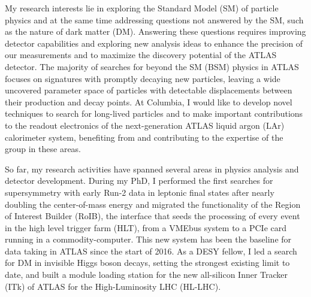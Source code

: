 \documentclass[a4paper]{article}
\begin{document}
\thispagestyle{fancy} 
 \lfoot{} \rfoot{\bf \thepage} \cfoot{}

\fontsize{11}{14}
\selectfont


My research interests lie in exploring the Standard Model (SM) of particle physics and at the same time addressing questions not answered by the SM, such as the nature of dark matter (DM). Answering these questions requires improving detector capabilities and exploring new analysis ideas to enhance the precision of our measurements and to maximize the discovery potential of the ATLAS detector. The majority of searches for beyond the SM (BSM) physics in ATLAS focuses on signatures with promptly decaying new particles, leaving a wide uncovered parameter space of particles with detectable displacements between their production and decay points. At Columbia, I would like to develop novel techniques to search for long-lived particles and to make important contributions to the readout electronics of the next-generation ATLAS liquid argon (LAr) calorimeter system, benefiting from and contributing to the expertise of the group in these areas.

\bigskip

So far, my research activities have spanned several areas in physics analysis and detector development. During my PhD, I performed the first searches for supersymmetry with early Run-2 data in leptonic final states after nearly doubling the center-of-mass energy and migrated the functionality of the Region of Interest Builder (RoIB), the interface that seeds the processing of every event in the high level trigger farm (HLT), from a VMEbus system to a PCIe card running in a commodity-computer. This new system has been the baseline for data taking in ATLAS since the start of 2016. As a DESY fellow, I led a search for DM in invisible Higgs boson decays, setting the strongest existing limit to date, and built a module loading station for the new all-silicon Inner Tracker (ITk) of ATLAS for the High-Luminosity LHC (HL-LHC).

\bigskip
\end{document}
